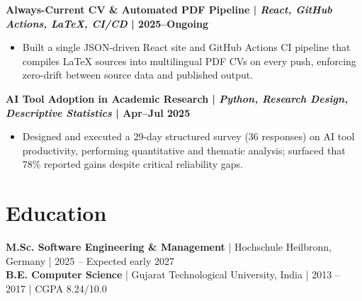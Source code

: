 \documentclass[letterpaper,10pt]{article}
\begin{document}
\noindent\textbf{Always-Current CV \& Automated PDF Pipeline | \textit{React, GitHub Actions, LaTeX, CI/CD} | 2025–Ongoing}\\
\begin{itemize}[leftmargin=0.15in,topsep=2pt,itemsep=2pt,parsep=0pt]
\item\small{Built a single JSON-driven React site and GitHub Actions CI pipeline that compiles LaTeX sources into multilingual PDF CVs on every push, enforcing zero-drift between source data and published output.}
\end{itemize}

\noindent\textbf{AI Tool Adoption in Academic Research | \textit{Python, Research Design, Descriptive Statistics} | Apr–Jul 2025}\\
\begin{itemize}[leftmargin=0.15in,topsep=2pt,itemsep=2pt,parsep=0pt]
\item\small{Designed and executed a 29-day structured survey (36 responses) on AI tool productivity, performing quantitative and thematic analysis; surfaced that 78\% reported gains despite critical reliability gaps.}
\end{itemize}


\section{Education}
{\small \textbf{M.Sc. Software Engineering \& Management} | Hochschule Heilbronn, Germany | 2025 – Expected early 2027}\\
{\small \textbf{B.E. Computer Science} | Gujarat Technological University, India | 2013 – 2017 | CGPA 8.24/10.0}
\end{document}
